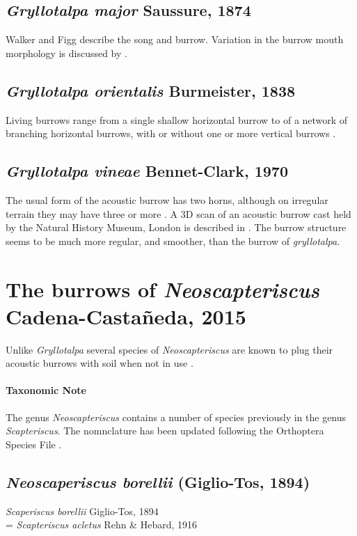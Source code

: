 \documentclass{article}
\begin{document}
   \subsection{\textit{Gryllotalpa major} Saussure, 1874 \cite{saussure1874}}
   Walker and Figg \cite{walker1990} describe the song and burrow. Variation in the burrow mouth morphology is discussed by \cite{hill2006}.
   
   \subsection{\textit{Gryllotalpa orientalis} Burmeister, 1838 \cite{burmesietr1838}}
   Living burrows range from a single shallow horizontal burrow to of a network of branching horizontal burrows, with or without one or more vertical burrows \cite{endo2007,endo2008}.
   
   \subsection{\textit{Gryllotalpa vineae} Bennet-Clark, 1970 \cite{bennetclark1970b}}
   The usual form of the acoustic burrow has two horns, although on irregular terrain they may have three or more \cite{bennetclark1970a}. A 3D scan of an acoustic burrow cast held by the Natural History Museum, London is described in \cite{baker2016}. The burrow structure seems to be much more regular, and smoother, than the burrow of \textit{gryllotalpa}.

   \section{The burrows of \textit{Neoscapteriscus} Cadena-Castañeda, 2015}
   Unlike \textit{Gryllotalpa} several species of \textit{Neoscapteriscus} are known to plug their acoustic burrows with soil when not in use \cite{walker1990}.
   
   \paragraph{Taxonomic Note}
   The genus \textit{Neoscapteriscus} contains a number of species previously in the genus \textit{Scapteriscus}. The nomnclature has been updated following the Orthoptera Species File \cite{eades2016}.
   
   \subsection{\textit{Neoscaperiscus borellii} (Giglio-Tos, 1894) \cite{giglio-tos1894}}
   \textit{Scaperiscus borellii} Giglio-Tos, 1894\\
   = \textit{Scapteriscus acletus} Rehn \& Hebard, 1916
\end{document}
